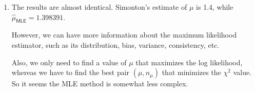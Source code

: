 \documentclass[11pt]{article}
\begin{document}
\begin{enumerate}
\item The results are almost identical. Simonton's estimate of $\mu$ is 1.4, while $\hat{\mu}_{\mathsf{MLE}}=1.398391$. \par
However, we can have more information about the maximum likelihood estimator, such as its distribution, bias, variance, consistency, etc. \par
Also, we only need to find a value of $\mu$ that maximizes the log likelihood, whereas we have to find the best pair $(\mu, n_{\mu})$ that minimizes the $\chi^2$ value. So it seems the MLE method is somewhat less complex.



\end{enumerate}
\end{document}
